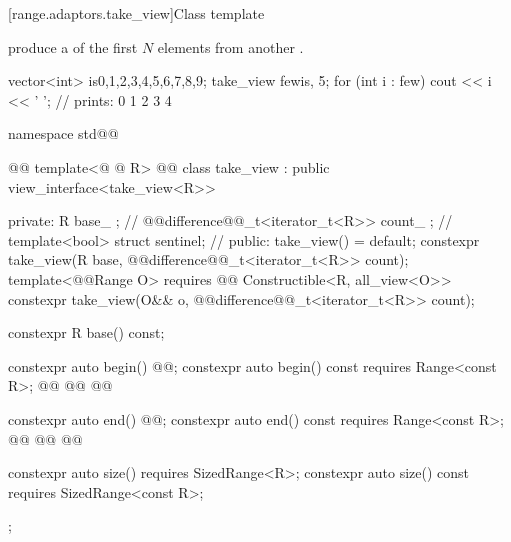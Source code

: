 {[range.adaptors.take_view]{Class template }

\pnum
{}   produce a
 of the first $N$ elements from another
.

\pnum
\begin{example}
\begin{codeblock}
vector<int> is{0,1,2,3,4,5,6,7,8,9};
take_view few{is, 5};
for (int i : few)
  cout << i << ' '; // prints: 0 1 2 3 4
\end{codeblock}
\end{example}

\begin{codeblock}
namespace std@@ { @@
  template<@ @ R>
    @@
  class take_view : public view_interface<take_view<R>> {
  private:
    R base_ {};                                      // \expos
    @@difference@@_t<iterator_t<R>> count_ {}; // \expos
    template<bool> struct sentinel;                  // \expos
  public:
    take_view() = default;
    constexpr take_view(R base, @@difference@@_t<iterator_t<R>> count);
    template<@@Range O>
      requires @@ Constructible<R, all_view<O>>
    constexpr take_view(O&& o, @@difference@@_t<iterator_t<R>> count);

    constexpr R base() const;

    constexpr auto begin() @@;
    constexpr auto begin() const requires Range<const R>;
    @@
    @@
      @@

    constexpr auto end() @@;
    constexpr auto end() const requires Range<const R>;
    @@
    @@
      @@

    constexpr auto size() requires SizedRange<R>;
    constexpr auto size() const requires SizedRange<const R>;
  };

}
\end{codeblock}}
